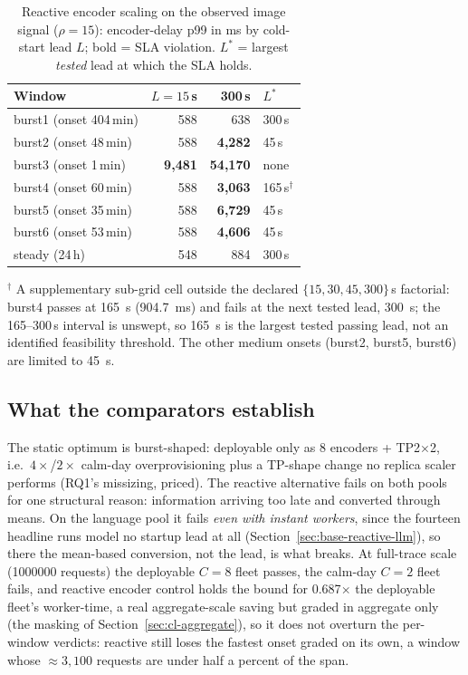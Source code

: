 \begin{table}[htbp]
\centering
\caption[Reactive encoder scaling on the observed image signal]{Reactive
encoder scaling on the observed image signal ($\rho{=}15$): encoder-delay p99
in ms by cold-start lead $L$; bold = SLA violation. $L^{*}$ = largest
\emph{tested} lead at which the SLA holds.}
\label{tab:base-react-enc}
\small
\begin{tabular}{@{}lrrl@{}}
\toprule
Window & $L{=}15$\,s & 300\,s & $L^{*}$ \\
\midrule
burst1 (onset 404\,min) & 588 & 638 & 300\,s \\
burst2 (onset 48\,min) & 588 & \textbf{4{,}282} & 45\,s \\
burst3 (onset 1\,min) & \textbf{9{,}481} & \textbf{54{,}170} & none \\
burst4 (onset 60\,min) & 588 & \textbf{3{,}063} & 165\,s$^{\dagger}$ \\
burst5 (onset 35\,min) & 588 & \textbf{6{,}729} & 45\,s \\
burst6 (onset 53\,min) & 588 & \textbf{4{,}606} & 45\,s \\
steady (24\,h) & 548 & 884 & 300\,s \\
\bottomrule
\end{tabular}

\vspace{2pt}
{\footnotesize $^{\dagger}$ A supplementary sub-grid cell outside the declared
$\{15,30,45,300\}$\,s factorial: burst4 passes at \SI{165}{\second}
(\SI{904.7}{\milli\second}) and fails at the next tested lead,
\SI{300}{\second}; the 165--300\,s interval is unswept, so \SI{165}{\second} is
the largest tested passing lead, not an identified feasibility threshold. The
other medium onsets (burst2, burst5, burst6) are limited to \SI{45}{\second}.}
\end{table}

\subsection{What the comparators establish}
\label{sec:base-summary}

The static optimum is burst-shaped: deployable only as 8 encoders +
TP2$\times$2, i.e.\ $4\times$/$2\times$ calm-day overprovisioning plus a
TP-shape change no replica scaler performs (RQ1's missizing, priced). The
reactive alternative fails on both pools for one structural reason:
information arriving too late and converted through means. On the
language pool it fails \emph{even with instant workers}, since the fourteen
headline runs model no startup lead at all
(Section~\ref{sec:base-reactive-llm}), so there the mean-based conversion,
not the lead, is what breaks. At full-trace scale
(\num{1000000} requests) the deployable $C{=}8$ fleet passes, the calm-day
$C{=}2$ fleet fails, and reactive encoder control holds the bound for
0.687$\times$ the deployable fleet's worker-time, a real aggregate-scale
saving but graded in aggregate only (the masking of
Section~\ref{sec:cl-aggregate}), so it does not overturn the per-window
verdicts: reactive still loses the fastest onset graded on its own, a window
whose ${\approx}3{,}100$ requests are under half a percent of the span.

